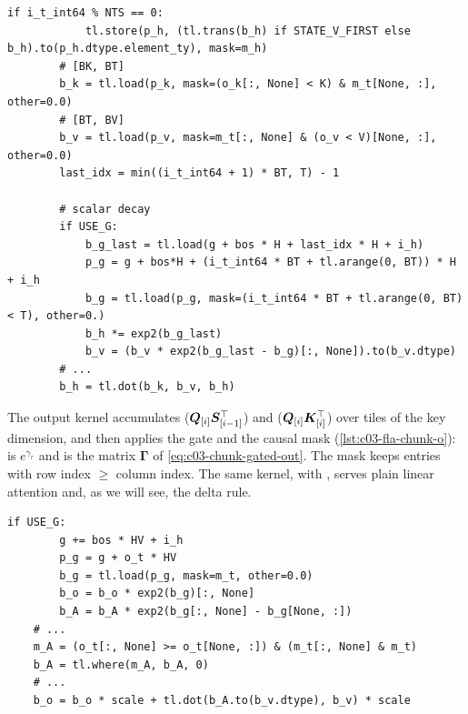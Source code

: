 \begin{sloppypar}
\begin{lstlisting}[caption={Excerpt from \texttt{repos/\allowbreak fla-org\_\_flash-linear-attention/\allowbreak fla/\allowbreak ops/\allowbreak common/\allowbreak chunk\_h.py} (kernel \texttt{chunk\_fwd\_kernel\_h}, loop over chunks).},label={lst:c03-fla-chunk-h}]
        if i_t_int64 % NTS == 0:
            tl.store(p_h, (tl.trans(b_h) if STATE_V_FIRST else b_h).to(p_h.dtype.element_ty), mask=m_h)
        # [BK, BT]
        b_k = tl.load(p_k, mask=(o_k[:, None] < K) & m_t[None, :], other=0.0)
        # [BT, BV]
        b_v = tl.load(p_v, mask=m_t[:, None] & (o_v < V)[None, :], other=0.0)
        last_idx = min((i_t_int64 + 1) * BT, T) - 1

        # scalar decay
        if USE_G:
            b_g_last = tl.load(g + bos * H + last_idx * H + i_h)
            p_g = g + bos*H + (i_t_int64 * BT + tl.arange(0, BT)) * H + i_h
            b_g = tl.load(p_g, mask=(i_t_int64 * BT + tl.arange(0, BT) < T), other=0.)
            b_h *= exp2(b_g_last)
            b_v = (b_v * exp2(b_g_last - b_g)[:, None]).to(b_v.dtype)
        # ...
        b_h = tl.dot(b_k, b_v, b_h)
\end{lstlisting}

The output kernel  accumulates 
($\bm{Q}_{[i]}\bm{S}_{[i-1]}^{\top}$) and  ($\bm{Q}_{[i]}\bm{K}_{[i]}^{\top}$) over
tiles of the key dimension, and then applies the gate and the causal mask
(\cref{lst:c03-fla-chunk-o}):  is $e^{\gamma_r}$ and
 is the matrix $\bm\Gamma$ of
\cref{eq:c03-chunk-gated-out}. The mask keeps entries with row index $\ge$ column index. The
same kernel, with , serves plain linear attention and, as we will see, the delta
rule.

\begin{lstlisting}[caption={Excerpt from \texttt{repos/\allowbreak fla-org\_\_flash-linear-attention/\allowbreak fla/\allowbreak ops/\allowbreak common/\allowbreak chunk\_o.py} (kernel \texttt{chunk\_fwd\_kernel\_o}).},label={lst:c03-fla-chunk-o}]
    if USE_G:
        g += bos * HV + i_h
        p_g = g + o_t * HV
        b_g = tl.load(p_g, mask=m_t, other=0.0)
        b_o = b_o * exp2(b_g)[:, None]
        b_A = b_A * exp2(b_g[:, None] - b_g[None, :])
    # ...
    m_A = (o_t[:, None] >= o_t[None, :]) & (m_t[:, None] & m_t)
    b_A = tl.where(m_A, b_A, 0)
    # ...
    b_o = b_o * scale + tl.dot(b_A.to(b_v.dtype), b_v) * scale
\end{lstlisting}


\end{sloppypar}
